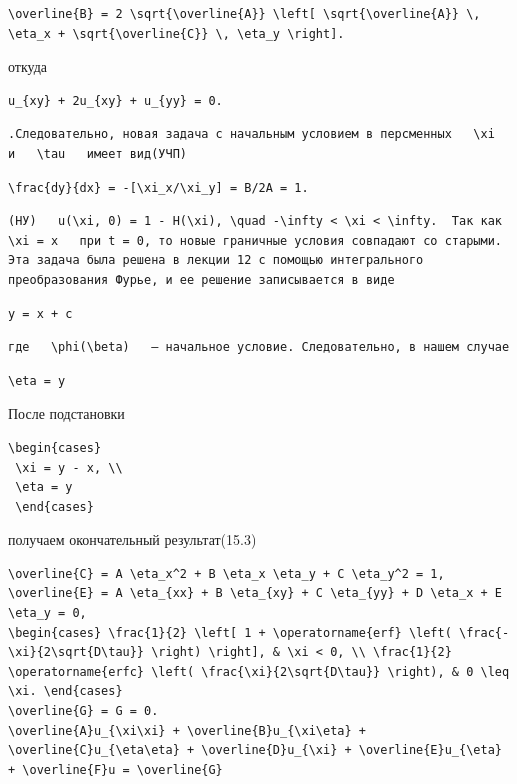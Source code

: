 \documentclass[
  ukrainian,
]{article}
\begin{document}
\begin{verbatim}
\overline{B} = 2 \sqrt{\overline{A}} \left[ \sqrt{\overline{A}} \, \eta_x + \sqrt{\overline{C}} \, \eta_y \right].
\end{verbatim}

откуда

\begin{verbatim}
u_{xy} + 2u_{xy} + u_{yy} = 0.
\end{verbatim}

\begin{verbatim}
.Следовательно, новая задача с начальным условием в персменных   \xi   и   \tau   имеет вид(УЧП)
\end{verbatim}

\begin{verbatim}
\frac{dy}{dx} = -[\xi_x/\xi_y] = B/2A = 1.
\end{verbatim}

\begin{verbatim}
(НУ)   u(\xi, 0) = 1 - H(\xi), \quad -\infty < \xi < \infty.  Так как   \xi = x   при t = 0, то новые граничные условия совпадают со старыми. Эта задача была решена в лекции 12 с помощью интегрального преобразования Фурье, и ее решение записывается в виде
\end{verbatim}

\begin{verbatim}
y = x + c
\end{verbatim}

\begin{verbatim}
где   \phi(\beta)   — начальное условие. Следовательно, в нашем случае
\end{verbatim}

\begin{verbatim}
\eta = y
\end{verbatim}

После подстановки

\begin{verbatim}
\begin{cases}
 \xi = y - x, \\
 \eta = y
 \end{cases}
\end{verbatim}

получаем окончательный результат(15.3)

\begin{verbatim}
\overline{C} = A \eta_x^2 + B \eta_x \eta_y + C \eta_y^2 = 1,
\overline{E} = A \eta_{xx} + B \eta_{xy} + C \eta_{yy} + D \eta_x + E \eta_y = 0,
\begin{cases} \frac{1}{2} \left[ 1 + \operatorname{erf} \left( \frac{-\xi}{2\sqrt{D\tau}} \right) \right], & \xi < 0, \\ \frac{1}{2} \operatorname{erfc} \left( \frac{\xi}{2\sqrt{D\tau}} \right), & 0 \leq \xi. \end{cases}
\overline{G} = G = 0.
\overline{A}u_{\xi\xi} + \overline{B}u_{\xi\eta} + \overline{C}u_{\eta\eta} + \overline{D}u_{\xi} + \overline{E}u_{\eta} + \overline{F}u = \overline{G}
\end{verbatim}
\end{document}

